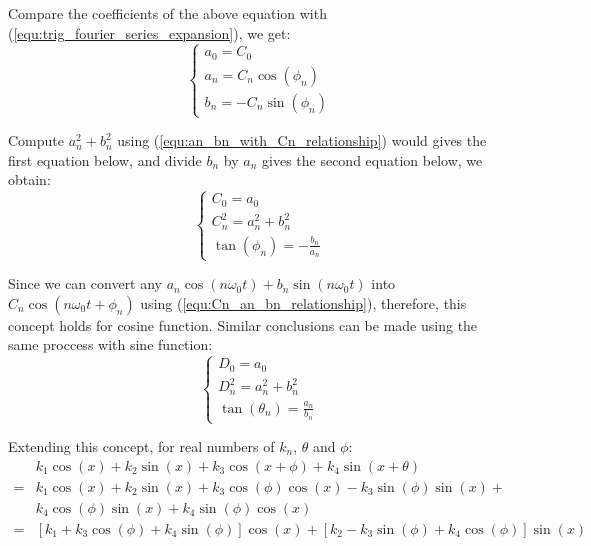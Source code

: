 \documentclass[12pt]{article}
\begin{document}
Compare the coefficients of the above equation with (\ref{equ:trig_fourier_series_expansion}), we get:
\begin{equation}
    \begin{cases}
        a_0     =       C_0                 \\
        a_n     =       C_n\cos(\phi_n)     \\
        b_n     =       -C_n\sin(\phi_n)
    \end{cases}
    \label{equ:an_bn_with_Cn_relationship}
\end{equation}

Compute $a_n^2 + b_n^2$ using ({\ref{equ:an_bn_with_Cn_relationship}}) would gives the first equation below, 
and divide $b_n$ by $a_n$ gives the second equation below, we obtain:
\begin{equation} \begin{cases}
    C_0 = a_0       \\
    C_n^2     =       a_n^2     +       b_n^2       \\
    \tan(\phi_n)   =    -\frac{b_n}{a_n}
    \label{equ:Cn_an_bn_relationship}
\end{cases} \end{equation}

Since we can convert any $a_n\cos(n\omega_0t)+b_n\sin(n\omega_0t)$ into $C_n\cos(n\omega_0t+\phi_n)$ 
using ({\ref{equ:Cn_an_bn_relationship}}), therefore, this concept holds for cosine function. 
Similar conclusions can be made using the same proccess with sine function:
\begin{equation} \begin{cases}
    D_0 = a_0       \\
    D_n^2     =       a_n^2     +       b_n^2       \\
    \tan(\theta_n)   =    \frac{a_n}{b_n}
    \label{equ:Dn_an_bn_relationship}
\end{cases} \end{equation}

Extending this concept, for real numbers of $k_n$, $\theta$ and $\phi$: 
$$\begin{aligned}
       & k_1\cos(x) + k_2\sin(x) + k_3\cos(x+\phi) + k_4\sin(x+\theta) \\
    =& k_1\cos(x) + k_2\sin(x) + k_3\cos(\phi)\cos(x) - k_3\sin(\phi)\sin(x) + \\
    &k_4\cos(\phi)\sin(x) + k_4\sin(\phi)\cos(x)  \\
    =& \left[k_1 + k_3\cos(\phi) + k_4\sin(\phi)\right] \cos(x) + \left[k_2 - k_3\sin(\phi) + k_4\cos(\phi)\right]\sin(x)   \\
\end{aligned}$$
\end{document}
